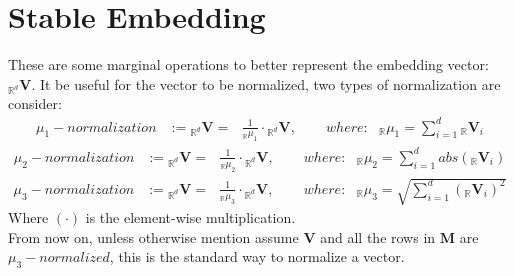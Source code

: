\documentclass[a4paper,fleqn]{cas-sc}
\begin{document}
\section{Stable Embedding}
These are some marginal operations to better represent the embedding vector: ${}_{\mathbb{R}^{d}}\mathbf{V}$. 
\noindent
It be useful for the vector to be normalized, two types of normalization are consider:
\begin{equation}
  \begin{split}
    \mu_{1}-normalization&:= {}_{\mathbb{R}^{d}}\mathbf{V} = \hspace{8pt} \frac{1}{{}_{\mathbb{R}}\mu_{1}}\cdot{}{}_{\mathbb{R}^{d}}\mathbf{V},\hspace{25pt}
    where: \hspace{8pt} {}_{\mathbb{R}}\mu_{1} = \sum_{i=1}^{d}{}_{\mathbb{R}}\mathbf{V}_{i}
  \end{split}
\end{equation}
\begin{equation}
  \begin{split}
    \mu_{2}-normalization&:= {}_{\mathbb{R}^{d}}\mathbf{V} = \hspace{8pt} \frac{1}{{}_{\mathbb{R}}\mu_{2}}\cdot{}{}_{\mathbb{R}^{d}}\mathbf{V},\hspace{25pt}
    where: \hspace{8pt} {}_{\mathbb{R}}\mu_{2} = \sum_{i=1}^{d}abs({}_{\mathbb{R}}\mathbf{V}_{i})
  \end{split}
\end{equation}
\begin{equation}
  \begin{split}
    \mu_{3}-normalization&:= {}_{\mathbb{R}^{d}}\mathbf{V} = \hspace{8pt} \frac{1}{{}_{\mathbb{R}}\mu_{3}}\cdot{}{}_{\mathbb{R}^{d}}\mathbf{V},\hspace{25pt}
    where: \hspace{8pt} {}_{\mathbb{R}}\mu_{3} = \sqrt{\sum_{i=1}^{d}({}_{\mathbb{R}}\mathbf{V}_{i})^{2}}
  \end{split}
\end{equation}
\noindent
Where $(\cdot{})$ is the element-wise multiplication.\\
\noindent
From now on, unless otherwise mention assume $\mathbf{V}$ and all the rows in $\mathbf{M}$ are $\mu_{3}-normalized$, this is the 
standard way to normalize a vector.\\
\end{document}
